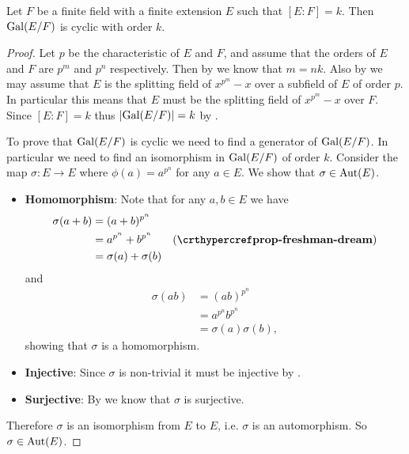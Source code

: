 \begin{corollary}
    Let $F$ be a finite field with a finite extension $E$ such that $[E:F] = k$. Then $\mathrm{Gal}(E/F)$ is cyclic with order $k$.
\end{corollary}
\begin{proof}
    Let $p$ be the characteristic of $E$ and $F$, and assume that the orders of $E$ and $F$ are $p^m$ and $p^n$ respectively. Then by  we know that $m = nk$. Also by  we may assume that $E$ is the splitting field of $x^{p^m} - x$ over a subfield of $E$ of order $p$. In particular this means that $E$ must be the splitting field of $x^{p^m} - x$ over $F$. Since $[E:F] = k$ thus $|\mathrm{Gal}(E/F)| = k$ by .

    To prove that $\mathrm{Gal}(E/F)$ is cyclic we need to find a generator of $\mathrm{Gal}(E/F)$. In particular we need to find an isomorphism in $\mathrm{Gal}(E/F)$ of order $k$. Consider the map $\sigma: E \to E$ where $\phi(a) = a^{p^n}$ for any $a \in E$. We show that $\sigma \in \mathrm{Aut}(E)$.
    \begin{itemize}
        \item \textbf{Homomorphism}: Note that for any $a, b \in E$ we have
        \begin{align*}
            \sigma(a+b) &= (a+b)^{p^n}\\
            &= a^{p^n} + b^{p^n} & (\myref{prop-freshman-dream})\\
            &= \sigma(a) + \sigma(b)
        \end{align*}
        and
        \begin{align*}
            \sigma(ab) &= (ab)^{p^n}\\
            &= a^{p^n}b^{p^n}\\
            &= \sigma(a)\sigma(b),
        \end{align*}
        showing that $\sigma$ is a homomorphism.

        \item \textbf{Injective}: Since $\sigma$ is non-trivial it must be injective by .

        \item \textbf{Surjective}: By  we know that $\sigma$ is surjective.
    \end{itemize}
    Therefore $\sigma$ is an isomorphism from $E$ to $E$, i.e. $\sigma$ is an automorphism. So $\sigma \in \mathrm{Aut}(E)$.


\end{proof}

